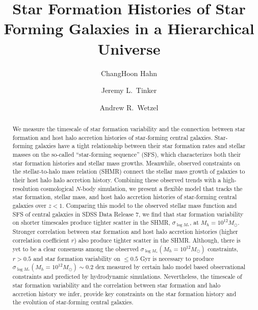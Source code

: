 \documentclass[12pt, letterpaper, preprint, tighten]{aastex62}
\begin{document}
\sloppy\sloppypar\frenchspacing

\title{Star Formation Histories of Star Forming Galaxies in a Hierarchical Universe} 
\author{ChangHoon Hahn}
\author{Jeremy L.~Tinker} 
\author{Andrew R.~Wetzel}

\begin{abstract}
    We measure the timescale of star formation variability and the connection 
    between star formation and host halo accretion histories of star-forming
    central galaxies. Star-forming galaxies have a tight relationship between 
    their star formation rates and stellar masses on the so-called ``star-forming 
    sequence'' (SFS), which characterizes both their star formation histories and 
    stellar mass growths. Meanwhile, observed constraints on the stellar-to-halo
    mass relation (SHMR) connect the stellar mass growth of galaxies to their host 
    halo halo accretion history. Combining these observed trends with a high-resolution 
    cosmological $N$-body simulation, we present a flexible model that tracks the 
    star formation, stellar mass, and host halo accretion histories of star-forming 
    central galaxies over $z < 1$. Comparing this model to the observed stellar 
    mass function and SFS of central galaxies in SDSS Data Release 7, we find 
    that star formation variability on shorter timescales produce tighter scatter 
    in the SHMR, $\sigma_{\log M_*}$, at $M_h{=}10^{12}M_\odot$. Stronger correlation 
    between star formation and host halo accretion histories (higher correlation 
    coefficient $r$) also produce tighter scatter in the SHMR. Although, there is 
    yet to be a clear consensus among the observed $\sigma_{\log M_*}(M_h=10^{12}M_\odot)$ 
    constraints, $r > 0.5$ and star formation variability on $\leq 0.5$ Gyr is 
    necessary to produce $\sigma_{\log M_*}(M_h=10^{12}M_\odot) \sim 0.2$ dex measured 
    by certain halo model based observational constraints and predicted by hydrodynamic 
    simulations. Nevertheless, the timescale of star formation variability and the 
    correlation between star formation and halo accretion history we infer, provide 
    key constraints on the star formation history and the evolution of star-forming 
    central galaxies.
\end{abstract}
    
\end{document}
